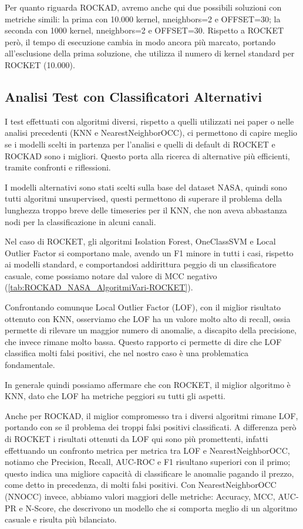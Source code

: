 Per quanto riguarda ROCKAD, avremo anche qui due possibili soluzioni con metriche simili: la prima con 10.000 kernel, n\textunderscore neighbors=2 e OFFSET=30; la seconda con 1000 kernel, n\textunderscore neighbors=2 e OFFSET=30.
Rispetto a ROCKET però, il tempo di esecuzione cambia in modo ancora più marcato, portando all'esclusione della prima soluzione, che utilizza il numero di kernel standard per ROCKET (10.000).
\pagebreak
\subsection{Analisi Test con Classificatori Alternativi}
I test effettuati con algoritmi diversi, rispetto a quelli utilizzati nei paper o nelle analisi precedenti (KNN e NearestNeighborOCC), ci permettono di capire meglio se i modelli scelti in partenza per l'analisi e quelli di default di ROCKET e ROCKAD sono i migliori.
Questo porta alla ricerca di alternative più efficienti, tramite confronti e riflessioni.

I modelli alternativi sono stati scelti sulla base del dataset NASA, quindi sono tutti algoritmi unsupervised, questi permettono di superare il problema della lunghezza troppo breve delle timeseries per il KNN, che non aveva abbastanza nodi per la classificazione in alcuni canali.

Nel caso di ROCKET, gli algoritmi Isolation Forest, OneClassSVM e Local Outlier Factor si comportano male, avendo un F1 minore in tutti i casi, rispetto ai modelli standard, e comportandosi addirittura peggio di un classificatore casuale, come possiamo notare dal valore di MCC negativo (\ref{tab:ROCKAD_NASA_AlgoritmiVari-ROCKET}).

Confrontando comunque Local Outlier Factor (LOF), con il miglior risultato ottenuto con KNN, osserviamo che LOF ha un valore molto alto di recall, ossia permette di rilevare un maggior numero di anomalie, a discapito della precisione, che invece rimane molto bassa.
Questo rapporto ci permette di dire che LOF classifica molti falsi positivi, che nel nostro caso è una problematica fondamentale.

In generale quindi possiamo affermare che con ROCKET, il miglior algoritmo è KNN, dato che LOF ha metriche peggiori su tutti gli aspetti.



Anche per ROCKAD, il miglior compromesso tra i diversi algoritmi rimane LOF, portando con se il problema dei troppi falsi positivi classificati.
A differenza però di ROCKET i risultati ottenuti da LOF qui sono più promettenti, infatti effettuando un confronto metrica per metrica tra LOF e NearestNeighborOCC, notiamo che Precision, Recall, AUC-ROC e F1 risultano superiori con il primo; questo indica una migliore capacità di classificare le anomalie pagando il prezzo, come detto in precedenza, di molti falsi positivi.
Con NearestNeighborOCC (NN\textunderscore OCC) invece, abbiamo valori maggiori delle metriche: Accuracy, MCC, AUC-PR e N-Score, che descrivono un modello che si comporta meglio di un algoritmo casuale e risulta più bilanciato.

